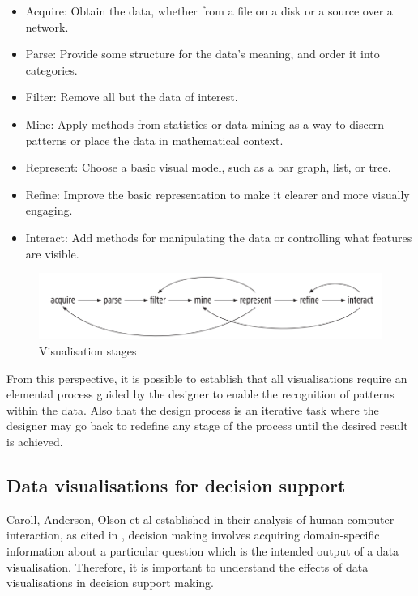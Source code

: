 \begin{displayquote}
	\begin{itemize}
\item Acquire: Obtain the data, whether from a file on a disk or a source over a network. 
\item Parse: Provide some structure for the data’s meaning, and order it into categories. 
\item Filter: Remove all but the data of interest. 
\item Mine: Apply methods from statistics or data mining as a way to discern patterns or place the data in mathematical context.
\item Represent: Choose a basic visual model, such as a bar graph, list, or tree. 
\item Refine: Improve the basic representation to make it clearer and more visually engaging. 
\item Interact: Add methods for manipulating the data or controlling what features are visible.
\end{itemize}
\end{displayquote}

\begin{figure}[!htb]
\begin{adjustbox}{width=1\textwidth,center=\textwidth}
  \centering
  \includegraphics[scale=1]{images/visualization_stages.png}
\end{adjustbox}
  \caption[Visualisation stages]{Visualisation stages  \cite{Cleveland1993} }
  \label{fig:data_visualization_stages}
\end{figure}
From this perspective, it is possible to establish that all visualisations require an elemental process guided by the designer to enable the recognition of patterns within the data. Also that the design process is an iterative task where the designer may go back to redefine any stage of the process until the desired result is achieved. 

\subsection{Data visualisations for decision support}
Caroll, Anderson, Olson et al established in their analysis of human-computer interaction,
 \cite{carroll1987mental} as cited in \cite{Zhu2008}, decision making involves acquiring domain-specific information about a particular question which is the intended output of a data visualisation. Therefore, it is important to understand the effects of data visualisations in decision support making.

